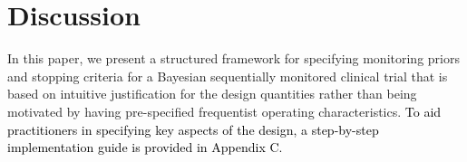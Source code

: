 \documentclass[12pt]{article}
\begin{document}
\section{Discussion}\label{sec:discussion}
In this paper, we present a structured framework for specifying monitoring priors and stopping criteria for a Bayesian sequentially monitored clinical trial that is based on intuitive justification for the design quantities rather than being motivated by having pre-specified frequentist operating characteristics. \textcolor{black}{To aid practitioners in specifying key aspects of the design, a step-by-step implementation guide is provided in Appendix C.}
%
%
%
%
%
%
\end{document}
